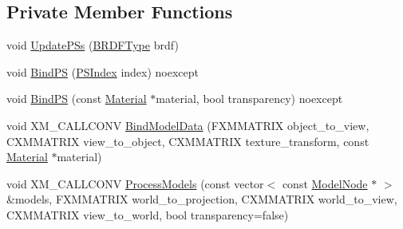 \subsection*{Private Member Functions}
\begin{DoxyCompactItemize}
\item 
void \hyperlink{classmage_1_1_variable_shading_pass_a4e0a0e7709d99bb94f3263bdf478f484}{Update\+P\+Ss} (\hyperlink{namespacemage_ae7a7a03a7b34d7e2689689bb8295cd38}{B\+R\+D\+F\+Type} brdf)
\item 
void \hyperlink{classmage_1_1_variable_shading_pass_a9352c4b8b435254768c3407550458fb5}{Bind\+PS} (\hyperlink{classmage_1_1_variable_shading_pass_a49519e421ac5be93136d9efdbf075d4a}{P\+S\+Index} index) noexcept
\item 
void \hyperlink{classmage_1_1_variable_shading_pass_a473c70d1e41be93942ea3a1332300a70}{Bind\+PS} (const \hyperlink{structmage_1_1_material}{Material} $\ast$material, bool transparency) noexcept
\item 
void X\+M\+\_\+\+C\+A\+L\+L\+C\+O\+NV \hyperlink{classmage_1_1_variable_shading_pass_a9041b2b7695ede893ea5bc6b5b43e98d}{Bind\+Model\+Data} (F\+X\+M\+M\+A\+T\+R\+IX object\+\_\+to\+\_\+view, C\+X\+M\+M\+A\+T\+R\+IX view\+\_\+to\+\_\+object, C\+X\+M\+M\+A\+T\+R\+IX texture\+\_\+transform, const \hyperlink{structmage_1_1_material}{Material} $\ast$material)
\item 
void X\+M\+\_\+\+C\+A\+L\+L\+C\+O\+NV \hyperlink{classmage_1_1_variable_shading_pass_ae95dbe1db9e047a4df38bc83c41e9e2b}{Process\+Models} (const vector$<$ const \hyperlink{classmage_1_1_model_node}{Model\+Node} $\ast$ $>$ \&models, F\+X\+M\+M\+A\+T\+R\+IX world\+\_\+to\+\_\+projection, C\+X\+M\+M\+A\+T\+R\+IX world\+\_\+to\+\_\+view, C\+X\+M\+M\+A\+T\+R\+IX view\+\_\+to\+\_\+world, bool transparency=false)
\end{DoxyCompactItemize}
